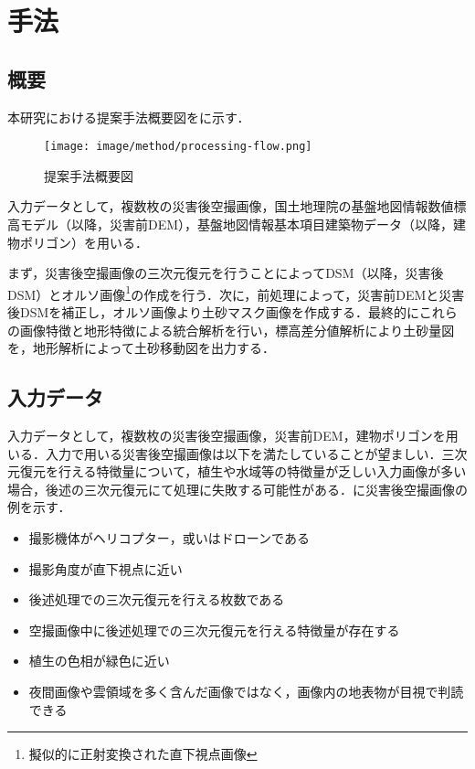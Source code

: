 \chapter{手法}
  \section{概要}
    本研究における提案手法概要図をに示す．

    \begin{figure}[tbp]
      \centering
      \texttt{[image: image/method/processing-flow.png]}
      \caption{提案手法概要図}
      \label{提案手法概要図}
    \end{figure}
    
    入力データとして，複数枚の災害後空撮画像，国土地理院の基盤地図情報数値標高モデル（以降，災害前DEM），基盤地図情報基本項目建築物データ\cite{基盤地図情報}（以降，建物ポリゴン）を用いる．

    まず，災害後空撮画像の三次元復元を行うことによってDSM（以降，災害後DSM）とオルソ画像\footnote{擬似的に正射変換された直下視点画像}の作成を行う．次に，前処理によって，災害前DEMと災害後DSMを補正し，オルソ画像より土砂マスク画像を作成する．最終的にこれらの画像特徴と地形特徴による統合解析を行い，標高差分値解析により土砂量図を，地形解析によって土砂移動図を出力する．



  \section{入力データ}
    \label{入力データ}
    入力データとして，複数枚の災害後空撮画像，災害前DEM，建物ポリゴンを用いる．入力で用いる災害後空撮画像は以下を満たしていることが望ましい．三次元復元を行える特徴量について，植生や水域等の特徴量が乏しい入力画像が多い場合，後述の三次元復元にて処理に失敗する可能性がある．に災害後空撮画像の例を示す．

    \begin{itemize}
      \setlength{\itemsep}{-5pt}
      \item 撮影機体がヘリコプター，或いはドローンである
      \item 撮影角度が直下視点に近い
      \item 後述処理での三次元復元を行える枚数である
      \item 空撮画像中に後述処理での三次元復元を行える特徴量が存在する
      \item 植生の色相が緑色に近い
      \item 夜間画像や雲領域を多く含んだ画像ではなく，画像内の地表物が目視で判読できる
    \end{itemize}

